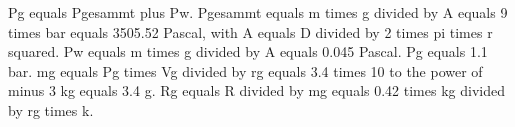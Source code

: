 Pg equals Pgesammt plus Pw. Pgesammt equals m times g divided by A equals 9 times bar equals 3505.52 Pascal, with A equals D divided by 2 times pi times r squared. Pw equals m times g divided by A equals 0.045 Pascal. Pg equals 1.1 bar. mg equals Pg times Vg divided by rg equals 3.4 times 10 to the power of minus 3 kg equals 3.4 g. Rg equals R divided by mg equals 0.42 times kg divided by rg times k.